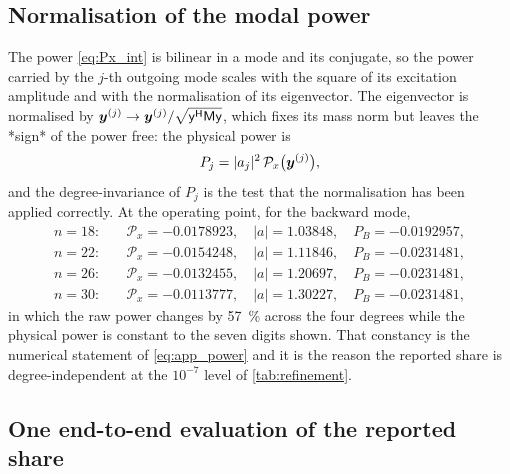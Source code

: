 \subsection{Normalisation of the modal power}

The power \eqref{eq:Px_int} is bilinear in a mode and its conjugate, so the power
carried by the $j$-th outgoing mode scales with the square of its excitation
amplitude and with the normalisation of its eigenvector.  The eigenvector is
normalised by $\boldsymbol{y}^{(j)}\to\boldsymbol{y}^{(j)}/\sqrt{\mathsf y^{\mathsf H}\mathsf
M\mathsf y}$, which fixes its mass norm but leaves the *sign* of the power free:
the physical power is
\begin{equation}
\label{eq:app_power}
P_j=|a_j|^{2}\,\mathcal{P}_x\bigl(\boldsymbol{y}^{(j)}\bigr),
\end{equation}
and the degree-invariance of $P_j$ is the test that the normalisation has been
applied correctly.  At the operating point, for the backward mode,
\begin{equation}
\label{eq:app_power_numbers}
\begin{aligned}
n=18:&\quad \mathcal{P}_x=-0.0178923,\quad |a|=1.03848,\quad P_B=-0.0192957,\\
n=22:&\quad \mathcal{P}_x=-0.0154248,\quad |a|=1.11846,\quad P_B=-0.0231481,\\
n=26:&\quad \mathcal{P}_x=-0.0132455,\quad |a|=1.20697,\quad P_B=-0.0231481,\\
n=30:&\quad \mathcal{P}_x=-0.0113777,\quad |a|=1.30227,\quad P_B=-0.0231481,
\end{aligned}
\end{equation}
in which the raw power changes by \SI{57}{\percent} across the four degrees while
the physical power is constant to the seven digits shown.  That constancy is the
numerical statement of \eqref{eq:app_power} and it is the reason the reported
share is degree-independent at the $10^{-7}$ level of
\cref{tab:refinement}.

\subsection{One end-to-end evaluation of the reported share}

